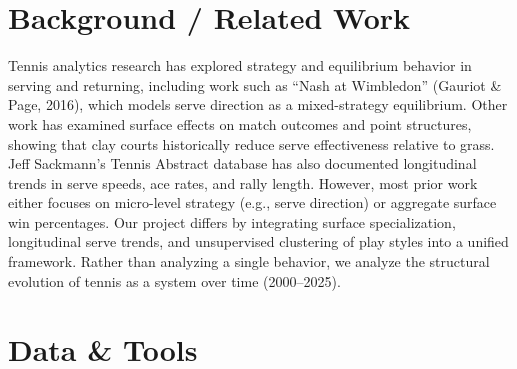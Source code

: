 \documentclass[12pt]{article}
\begin{document}
\section{Background / Related Work}

{\color{black}
Tennis analytics research has explored strategy and equilibrium behavior in serving and returning, including work such as “Nash at Wimbledon” (Gauriot & Page, 2016), which models serve direction as a mixed-strategy equilibrium. Other work has examined surface effects on match outcomes and point structures, showing that clay courts historically reduce serve effectiveness relative to grass. Jeff Sackmann’s Tennis Abstract database has also documented longitudinal trends in serve speeds, ace rates, and rally length. However, most prior work either focuses on micro-level strategy (e.g., serve direction) or aggregate surface win percentages. Our project differs by integrating surface specialization, longitudinal serve trends, and unsupervised clustering of play styles into a unified framework. Rather than analyzing a single behavior, we analyze the structural evolution of tennis as a system over time (2000–2025).

}

\section{Data \& Tools}
\end{document}
